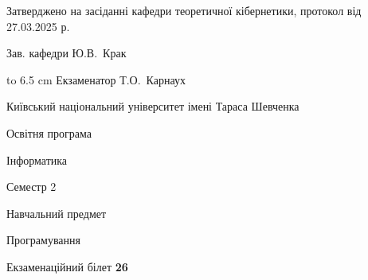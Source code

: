 \documentclass[12pt, ukrainian]{article}
\begin{document}
{\smallskip\smallskip \begin {scriptsize} Затверджено на засіданні кафедри теоретичної кібернетики, протокол   від   27.03.2025 р.\par\smallskip\smallskip\smallskip\smallskip
{\parbox {6.5 cm} {Зав. кафедри \dotfill Ю.В.~Крак}}\hspace {0.7cm} {\hbox to 6.5 cm { Екзаменатор \dotfill Т.О.~Карнаух}} \end{scriptsize}}
\newpage
{{\begin {scriptsize}\par
{ \center  Київський національний університет імені Тараса Шевченка \par}
{\parbox {5 cm}{Освітня програма \hfill}{\parbox {7 cm}{Інформатика\hfill}}\parbox {6 cm}{\hfill Семестр 2}}\par
{\parbox {5 cm} {Навчальний предмет \hfill}\parbox {7 cm}{Програмування \hfill}\parbox {6cm}{\hfill}\par}\vspace{-15pt} \end{scriptsize}}{\center Екзаменаційний білет \No \textbf { 26 }\par}}
\end{document}
